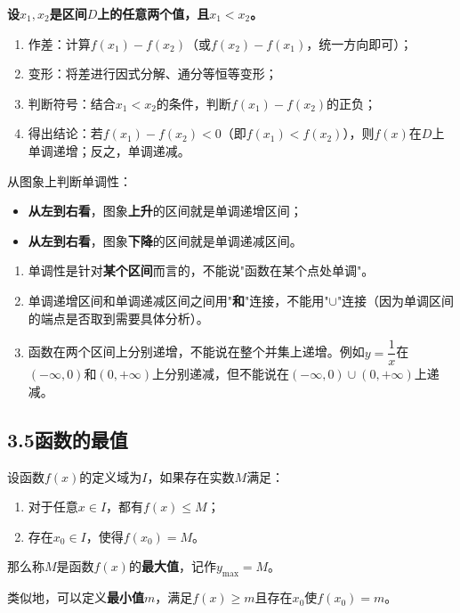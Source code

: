 \documentclass[12pt, a4paper]{ctexart}
\begin{document}
\begin{knowledgebox}[定义法证明单调性的步骤]
\textbf{设$x_1, x_2$是区间$D$上的任意两个值，且$x_1 < x_2$。}
\begin{enumerate}[leftmargin=2em]
  \item 作差：计算$f(x_1) - f(x_2)$（或$f(x_2)-f(x_1)$，统一方向即可）；
  \item 变形：将差进行因式分解、通分等恒等变形；
  \item 判断符号：结合$x_1 < x_2$的条件，判断$f(x_1)-f(x_2)$的正负；
  \item 得出结论：若$f(x_1)-f(x_2)<0$（即$f(x_1)<f(x_2)$），则$f(x)$在$D$上单调递增；反之，单调递减。
\end{enumerate}
\end{knowledgebox}

\begin{tipbox}[规律：利用图象判断单调性]
从图象上判断单调性：
\begin{itemize}[leftmargin=2em]
  \item \textbf{从左到右看}，图象\textbf{上升}的区间就是单调递增区间；
  \item \textbf{从左到右看}，图象\textbf{下降}的区间就是单调递减区间。
\end{itemize}
\end{tipbox}

\begin{warnbox}[易错提醒]
\begin{enumerate}[leftmargin=2em]
  \item 单调性是针对\textbf{某个区间}而言的，不能说"函数在某个点处单调"。
  \item 单调递增区间和单调递减区间之间用"\textbf{和}"连接，不能用"$\cup$"连接（因为单调区间的端点是否取到需要具体分析）。
  \item 函数在两个区间上分别递增，不能说在整个并集上递增。例如$y=\dfrac{1}{x}$在$(-\infty,0)$和$(0,+\infty)$上分别递减，但不能说在$(-\infty,0)\cup(0,+\infty)$上递减。
\end{enumerate}
\end{warnbox}

\subsection*{3.5\quad 函数的最值}

\begin{knowledgebox}[最大值与最小值]
设函数$f(x)$的定义域为$I$，如果存在实数$M$满足：
\begin{enumerate}[leftmargin=2em]
  \item 对于任意$x\in I$，都有$f(x)\leq M$；
  \item 存在$x_0\in I$，使得$f(x_0)=M$。
\end{enumerate}
那么称$M$是函数$f(x)$的\textbf{最大值}，记作$y_{\max}=M$。

类似地，可以定义\textbf{最小值}$m$，满足$f(x)\geq m$且存在$x_0$使$f(x_0)=m$。
\end{knowledgebox}
\end{document}
